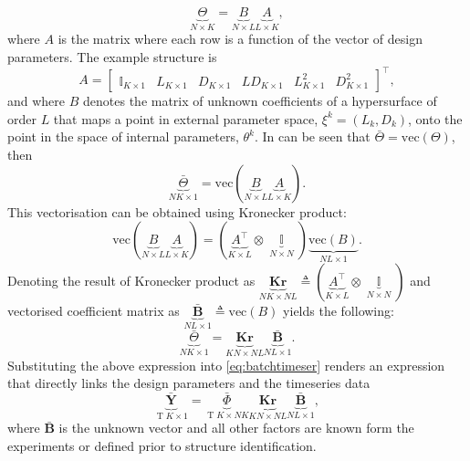 \documentclass[a4paper,11pt,twoside]{article}
\DeclareMathOperator{\eye}{\mathbb{I}}
\DeclareMathOperator{\T}{\mathrm{T}}
\theoremstyle{mytheoremstyle}
\begin{document}
\begin{equation}
\underbrace{\Theta}_{N \times K} = \underbrace{B}_{N \times L} \underbrace{A}_{L \times K},
\end{equation}
where $A$ is the matrix where each row is a function of the vector of design parameters. The example structure is
\begin{equation}
A = \left[\begin{array}{cccccc}
\eye_{K \times 1} & L_{K \times 1} & D_{K \times 1} & L D_{K \times 1} &  L^{2}_{K \times 1} & D^{2}_{K \times 1} 
\end{array}\right]^{\top},
\end{equation} 
and where $B$ denotes the matrix of unknown coefficients of a hypersurface of order $L$ that maps a point in external parameter space, $\xi^k = (L_k, D_k)$, onto the point in the space of internal parameters, $\theta^k$.
In can be seen that $\bar{\Theta} = \text{vec}(\Theta)$, then
\begin{equation}
\underbrace{\bar{\Theta}}_{NK \times 1} = \text{vec}\left(\underbrace{B}_{N \times L} \underbrace{A}_{L \times K}\right).
\end{equation}
This vectorisation can be obtained using Kronecker product:
\begin{equation}
\text{vec}\left(\underbrace{B}_{N \times L} \underbrace{A}_{L \times K}\right) = (\underbrace{A^{\top}}_{K \times L} \otimes \underbrace{\eye}_{N \times N}) \underbrace{\text{vec}(B)}_{NL \times 1}.
\end{equation}
Denoting the result of Kronecker product as $\underbrace{\mathbf{Kr}}_{NK \times NL} \triangleq (\underbrace{A^{\top}}_{K \times L} \otimes \underbrace{\eye}_{N \times N})$ and vectorised coefficient matrix as $\underbrace{\bar{\mathbf{B}}}_{NL \times 1} \triangleq \text{vec}(B)$  yields the following:
\begin{equation}\label{eq:BtoTheta}
\underbrace{\bar{\Theta}}_{NK \times 1} = \underbrace{\mathbf{Kr}}_{KN \times NL} \underbrace{\bar{\mathbf{B}}}_{NL \times 1}.
\end{equation}
Substituting the above expression into \eqref{eq:batchtimeser} renders an expression that directly links the design parameters and the timeseries data
\begin{equation}\label{eq:BtoY}
\underbrace{\bar{\mathbf{Y}}}_{\T K\times 1} = \underbrace{\bar{\Phi}}_{\T K \times NK} \underbrace{\mathbf{Kr}}_{KN \times NL} \underbrace{\bar{\mathbf{B}}}_{NL \times 1},
\end{equation}
where $\bar{\mathbf{B}}$ is the unknown vector and all other factors are known form the experiments or defined prior to structure identification. 
\end{document}
